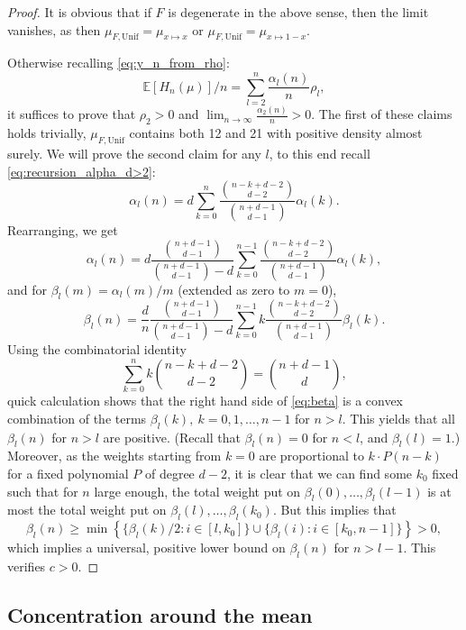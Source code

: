 \documentclass[11pt]{article}
\newcommand{\EE}{\mathbb{E}}
\newcommand{\Unif}{\mathrm{Unif}}
\theoremstyle{definition}
\begin{document}
\begin{proof}
    It is obvious that if $F$ is degenerate in the above sense, then the limit vanishes, as then $\mu_{F, \Unif}=\mu_{x\mapsto x}$ or $\mu_{F, \Unif}=\mu_{x\mapsto 1-x}$.
    
    Otherwise recalling \eqref{eq:y_n_from_rho}:
    $$\EE [H_n(\mu)]/n =\sum_{l=2}^{n}\frac{\alpha_l(n)}{n}\rho_l,$$
    it suffices to prove that $\rho_2>0$ and $\lim_{n\to\infty}\frac{\alpha_2(n)}{n}>0$. The first of these claims holds trivially, $\mu_{F, \Unif}$ contains both 12 and 21 with positive density almost surely. We will prove the second claim for any $l$, to this end recall \eqref{eq:recursion_alpha_d>2}:
    \begin{displaymath}
    \alpha_l(n)= d\sum_{k=0}^{n}\frac{\binom{n-k+d-2}{d-2}}{\binom{n+d-1}{d-1}}\alpha_l(k).
    \end{displaymath}
    Rearranging, we get
    $$\alpha_l(n)= d\frac{\binom{n+d-1}{d-1}}{\binom{n+d-1}{d-1}-d}\sum_{k=0}^{n-1}\frac{\binom{n-k+d-2}{d-2}}{\binom{n+d-1}{d-1}}\alpha_l(k),$$
    and for $\beta_l(m)=\alpha_l(m)/m$ (extended as zero to $m=0$),
    \begin{equation}\label{eq:beta}
    \beta_l(n)= \frac{d}{n}\frac{\binom{n+d-1}{d-1}}{\binom{n+d-1}{d-1}-d}\sum_{k=0}^{n-1}k\frac{\binom{n-k+d-2}{d-2}}{\binom{n+d-1}{d-1}}\beta_l(k).
    \end{equation}
    Using the combinatorial identity 
    $$\sum_{k=0}^{n}k \binom{n-k+d-2}{d-2}=\binom{n+d-1}{d},$$
    quick calculation shows that the right hand side of \eqref{eq:beta} is a convex combination of the terms  $\beta_l(k), \ k=0, 1, \dots, n-1$ for $n>l$. This yields that all $\beta_l(n)$ for $n>l$ are positive. (Recall that $\beta_l(n)=0$ for $n<l$, and $\beta_l(l)=1$.) Moreover, as the weights starting from $k=0$ are proportional to $k\cdot P(n-k)$ for a fixed polynomial $P$ of degree $d-2$, it is clear that we can find some $k_0$ fixed such that for $n$ large enough, the total weight put on $\beta_l(0), \dots, \beta_l(l-1)$ is at most the total weight put on $\beta_l(l), \dots, \beta_l(k_0)$. But this implies that 
    $$\beta_l(n)\geq \min \left\{\{\beta_l(k)/2: i\in[l, k_0]\}\cup \{\beta_l(i): i\in[k_0, n-1]\}\right\}>0,$$
    which implies a universal, positive lower bound on $\beta_l(n)$ for $n>l-1$. This verifies $c>0$.
\end{proof}

\subsection{Concentration around the mean}
\end{document}
